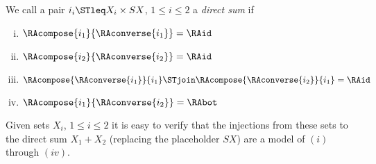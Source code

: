 \begin{definition}
\label{def:direct_sum}	
	We call a pair $i_i \STleq X_i \times SX$, $1 \le i \le 2$ a \emph{direct sum} if
	\begin{enumerate}[(i)]
		\item $\RAcompose{i_1}{\RAconverse{i_1}} = \RAid$
		\item $\RAcompose{i_2}{\RAconverse{i_2}} = \RAid$
		\item $\RAcompose{\RAconverse{i_1}}{i_1} \STjoin \RAcompose{\RAconverse{i_2}}{i_1} = \RAid$
		\item $\RAcompose{i_1}{\RAconverse{i_2}} = \RAbot$
	\end{enumerate}
	Given sets $X_i$, $1 \le i \le 2$ it is easy to verify that the injections from these sets to the direct sum $X_1 + X_2$ (replacing the placeholder $SX$) are a model of $(i)$ through $(iv)$.
\end{definition}